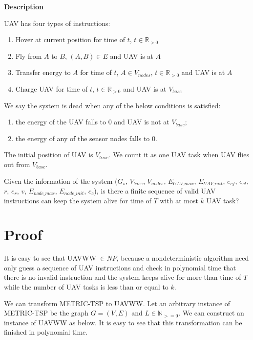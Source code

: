 \documentclass[11pt]{article}
\begin{document}
\noindent
\textbf{Description}

UAV has four types of instructions:
\begin{enumerate}[noitemsep]
\item Hover at current position for time of $t$, $t \in \mathbb{R}_{>0}$
\item Fly from $A$ to $B$, $(A,B) \in E$ and UAV is at $A$
\item Transfer energy to $A$ for time of $t$, $A \in V_{nodes}$, $t \in \mathbb{R}_{>0}$ and UAV is at $A$
\item Charge UAV for time of $t$, $t \in \mathbb{R}_{>0}$ and UAV is at $V_{base}$
\end{enumerate}

We say the system is dead when any of the below conditions is satisfied:
\begin{enumerate}[noitemsep]
\item the energy of the UAV falls to 0 and UAV is not at $V_{base}$;
\item the energy of any of the sensor nodes falls to 0.
\end{enumerate}

The initial position of UAV is $V_{base}$. We count it as one UAV task when UAV flies out from $V_{base}$.

Given the information of the system ($G_s$, $V_{base}$, $V_{nodes}$, $E_{UAV\_max} $, $E_{UAV\_init}$, $e_{cf}$, $e_{ct}$, $r$, $e_r$, $v$, $E_{node\_max}$, $E_{node\_init}$, $e_{c}$), is there a finite sequence of valid UAV instructions can keep the system alive for time of $T$ with at most $k$ UAV task?

\section{Proof}
It is easy to see that UAVWW $\in NP$, because a nondeterministic algorithm need only guess a sequence of UAV instructions and check in polynomial time that there is no invalid instruction and the system keeps alive for more than time of $T$ while the number of UAV tasks is less than or equal to $k$.

We can transform METRIC-TSP to UAVWW. Let an arbitrary instance of METRIC-TSP be the graph $G = (V, E)$ and $L \in \mathbb{N}_{>=0}$. We can construct an instance of UAVWW as below. It is easy to see that this transformation can be finished in polynomial time.
\end{document}
